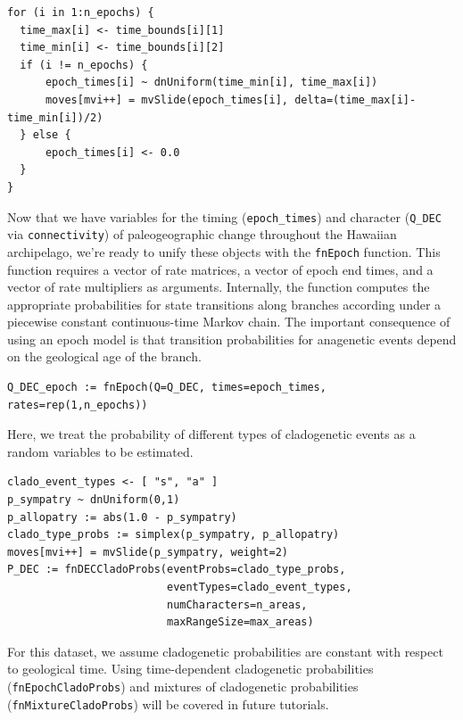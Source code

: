 \begin{snugshade}
\begin{lstlisting}
for (i in 1:n_epochs) {
  time_max[i] <- time_bounds[i][1]
  time_min[i] <- time_bounds[i][2]
  if (i != n_epochs) {
      epoch_times[i] ~ dnUniform(time_min[i], time_max[i])
      moves[mvi++] = mvSlide(epoch_times[i], delta=(time_max[i]-time_min[i])/2)
  } else {
      epoch_times[i] <- 0.0
  }
}
\end{lstlisting}
\end{snugshade}

Now that we have variables for the timing ({\tt epoch\_times}) and character ({\tt Q\_DEC} via {\tt connectivity}) of paleogeographic change throughout the Hawaiian archipelago, we're ready to unify these objects with the {\tt fnEpoch} function.
This function requires a vector of rate matrices, a vector of epoch end times, and a vector of rate multipliers as arguments.
Internally, the function computes the appropriate probabilities for state transitions along branches according under a piecewise constant continuous-time Markov chain.
The important consequence of using an epoch model is that transition probabilities for anagenetic events depend on the geological age of the branch.

\begin{snugshade}
\begin{lstlisting}
Q_DEC_epoch := fnEpoch(Q=Q_DEC, times=epoch_times, rates=rep(1,n_epochs))
\end{lstlisting}
\end{snugshade}

Here, we treat the probability of different types of cladogenetic events as a random variables to be estimated.

\begin{snugshade}
\begin{lstlisting}
clado_event_types <- [ "s", "a" ]
p_sympatry ~ dnUniform(0,1)
p_allopatry := abs(1.0 - p_sympatry)
clado_type_probs := simplex(p_sympatry, p_allopatry)
moves[mvi++] = mvSlide(p_sympatry, weight=2)
P_DEC := fnDECCladoProbs(eventProbs=clado_type_probs,
                         eventTypes=clado_event_types,
                         numCharacters=n_areas,
                         maxRangeSize=max_areas)
\end{lstlisting}
\end{snugshade}

For this dataset, we assume cladogenetic probabilities are constant with respect to geological time.
Using time-dependent cladogenetic probabilities ({\tt fnEpochCladoProbs}) and mixtures of cladogenetic probabilities ({\tt fnMixtureCladoProbs}) will be covered in future tutorials.

